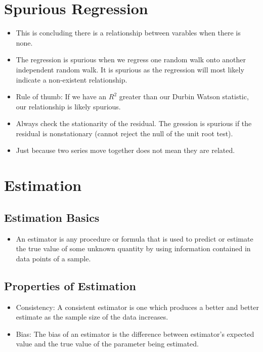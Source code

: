 \documentclass[11pt]{article}
\begin{document}
\section{Spurious Regression}
\begin{itemize}
    \item This is concluding there is a relationship between varables when there is none. 
    \item The regression is spurious when we regress one random walk onto another independent 
    random walk. It is spurious as the regression will most likely indicate a non-existent 
    relationship. 
    \item Rule of thumb: If we have an $R^2$ greater than our Durbin Watson statistic, our 
    relationship is likely spurious. 
    \item Always check the stationarity of the residual. The gression is spurious if the 
    residual is nonstationary (cannot reject the null of the unit root test).
    \item Just because two series move together does not mean they are related. 
\end{itemize}

\section{Estimation}
\subsection{Estimation Basics}
\begin{itemize}
    \item An estimator is any procedure or formula that is used to predict or estimate the
    true value of some unknown quantity by using information contained in data points of a 
    sample.
\end{itemize}

\subsection{Properties of Estimation}
\begin{itemize}
    \item Consistency: A consistent estimator is one which produces a better and better 
    estimate as the sample size of the data increases. 
    \item Bias: The bias of an estimator is the difference between estimator's expected value 
    and the true value of the parameter being estimated. 
\end{itemize}
\end{document}
